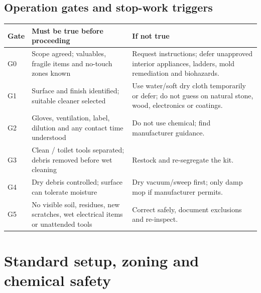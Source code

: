\documentclass[10pt,letterpaper,oneside]{article}
\newcommand{\smalltable}{\par\small\renewcommand{\arraystretch}{1.24}}
\newcommand{\restorenormalfonttable}{\par\normalsize\renewcommand{\arraystretch}{1}}
\begin{document}
\subsection{Operation gates and stop-work triggers}
\smalltable\begin{longtable}{p{.12\linewidth}>{\raggedright\arraybackslash}p{.31\linewidth}>{\raggedright\arraybackslash}p{.48\linewidth}}\toprule
Gate & Must be true before proceeding & If not true\\\midrule\endhead
G0 & Scope agreed; valuables, fragile items and no-touch zones known & Request instructions; defer unapproved interior appliances, ladders, mold remediation and biohazards.\\
G1 & Surface and finish identified; suitable cleaner selected & Use water/soft dry cloth temporarily or defer; do not guess on natural stone, wood, electronics or coatings.\\
G2 & Gloves, ventilation, label, dilution and any contact time understood & Do not use chemical; find manufacturer guidance.\\
G3 & Clean / toilet tools separated; debris removed before wet cleaning & Restock and re-segregate the kit.\\
G4 & Dry debris controlled; surface can tolerate moisture & Dry vacuum/sweep first; only damp mop if manufacturer permits.\\
G5 & No visible soil, residues, new scratches, wet electrical items or unattended tools & Correct safely, document exclusions and re-inspect.\\\bottomrule\end{longtable}\restorenormalfonttable

\section{Standard setup, zoning and chemical safety}
\end{document}
